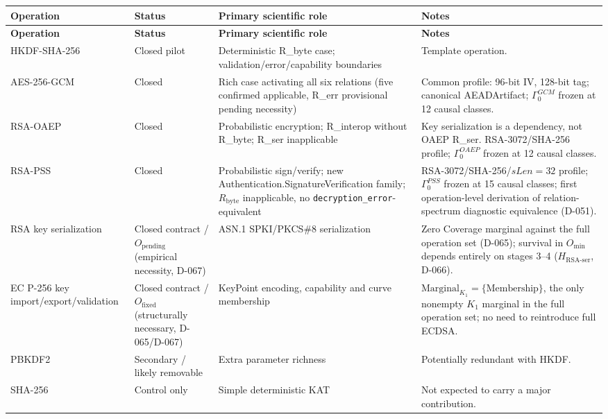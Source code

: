\documentclass[11pt,a4paper]{article}
\begin{document}
\begin{longtable}{@{}L{0.23\textwidth}L{0.23\textwidth}L{0.23\textwidth}L{0.23\textwidth}@{}}
\toprule
\textbf{Operation} & \textbf{Status} & \textbf{Primary scientific role} & \textbf{Notes}\\
\midrule\endfirsthead
\toprule
\textbf{Operation} & \textbf{Status} & \textbf{Primary scientific role} & \textbf{Notes}\\
\midrule\endhead
HKDF-SHA-256 & Closed pilot & Deterministic R\_byte case; validation/error/capability boundaries & Template operation.\\
AES-256-GCM & Closed & Rich case activating all six relations (five confirmed applicable, R\_err provisional pending necessity) & Common profile: 96-bit IV, 128-bit tag; canonical AEADArtifact; $\Gamma_0^{GCM}$ frozen at 12 causal classes.\\
RSA-OAEP & Closed & Probabilistic encryption; R\_interop without R\_byte; R\_ser inapplicable & Key serialization is a dependency, not OAEP R\_ser. RSA-3072/SHA-256 profile; $\Gamma_0^{OAEP}$ frozen at 12 causal classes.\\
RSA-PSS & Closed & Probabilistic sign/verify; new Authentication.SignatureVerification family; $R_{\text{byte}}$ inapplicable, no \texttt{decryption\_error}-equivalent & RSA-3072/SHA-256/$sLen=32$ profile; $\Gamma_0^{PSS}$ frozen at 15 causal classes; first operation-level derivation of relation-spectrum diagnostic equivalence (D-051).\\
RSA key serialization & Closed contract / $O_{\text{pending}}$ (empirical necessity, D-067) & ASN.1 SPKI/PKCS\#8 serialization & Zero Coverage marginal against the full operation set (D-065); survival in $O_{\min}$ depends entirely on stages 3--4 ($H_{\text{RSA-ser}}$, D-066).\\
EC P-256 key import/export/validation & Closed contract / $O_{\text{fixed}}$ (structurally necessary, D-065/D-067) & KeyPoint encoding, capability and curve membership & $\text{Marginal}_{K_1}=\{\text{Membership}\}$, the only nonempty $K_1$ marginal in the full operation set; no need to reintroduce full ECDSA.\\
PBKDF2 & Secondary / likely removable & Extra parameter richness & Potentially redundant with HKDF.\\
SHA-256 & Control only & Simple deterministic KAT & Not expected to carry a major contribution.\\
\bottomrule
\end{longtable}
\end{document}

